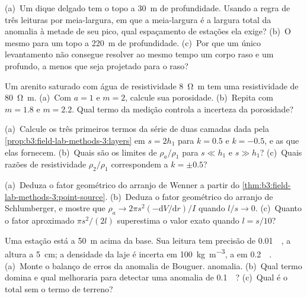 \begin{exercise}[$\star\star$]\label{exo:b3:field-lab-methods-3:7}
(a)~Um dique delgado tem o topo a \qty{30}{m} de profundidade. Usando a regra de três
leituras por meia-largura, em que a meia-largura é a largura total da
anomalia à metade de seu pico, qual espaçamento de estações ela exige? (b)~O
mesmo para um topo a \qty{220}{m} de profundidade. (c)~Por que um único levantamento não
consegue resolver ao mesmo tempo um corpo raso e um profundo, a menos que seja projetado para o
raso?
\end{exercise}

\begin{exercise}[$\star\star$]\label{exo:b3:field-lab-methods-3:8}
Um arenito saturado com água de resistividade \qty{8}{\ohm\metre} tem uma
resistividade de \qty{80}{\ohm\metre}. (a)~Com $a = 1$ e $m = 2$,
calcule sua porosidade. (b)~Repita com $m = 1.8$ e $m = 2.2$. Qual
termo da medição controla a incerteza da porosidade?
\end{exercise}

\begin{exercise}[$\star\star$]\label{exo:b3:field-lab-methods-3:9}
(a)~Calcule os três primeiros termos da série de duas camadas
dada pela \cref{prop:b3:field-lab-methods-3:layers} em $s = 2h_1$ para $k =
\num{0.5}$ e $k = \num{-0.5}$, e as  que
elas fornecem. (b)~Quais são os limites de $\rho_a/\rho_1$ para $s \ll h_1$ e
$s \gg h_1$? (c)~Quais razões de resistividade $\rho_2/\rho_1$ correspondem a
$k = \pm 0.5$?
\end{exercise}

\begin{exercise}[$\star\star\star$]\label{exo:b3:field-lab-methods-3:10}
(a)~Deduza o fator geométrico do arranjo de Wenner a partir
do \cref{thm:b3:field-lab-methods-3:point-source}. (b)~Deduza o fator geométrico
do arranjo de Schlumberger, e mostre que $\rho_a \to 2\pi s^2(-\mathrm{d}V/
\mathrm{d}r)/I$ quando $l/s \to 0$. (c)~Quanto o fator aproximado
$\pi s^2/(2l)$ superestima o valor exato quando $l = s/10$?
\end{exercise}

\begin{exercise}[$\star\star\star$]\label{exo:b3:field-lab-methods-3:11}
Uma estação está a \qty{50}{m} acima da base. Sua leitura tem precisão de
\qty{0.01}{\milli\gal}, a altura a \qty{5}{cm}; a densidade da
laje é incerta em \qty{100}{kg.m^{-3}}, a  em
\qty{0.2}{\milli\gal}. (a)~Monte o balanço de erros da anomalia de Bouguer.
anomalia. (b)~Qual termo domina e qual melhoraria para detectar uma
anomalia de \qty{0.1}{\milli\gal}? (c)~Qual é o total sem
o termo de terreno?
\end{exercise}

